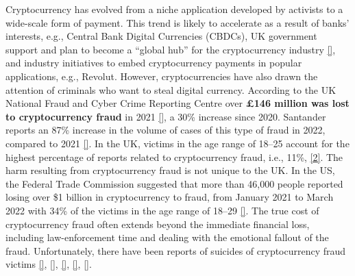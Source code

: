  Cryptocurrency has evolved from a niche application developed by activists to a wide-scale form of payment. This trend is likely to accelerate as a result of banks' interests, e.g., Central Bank Digital Currencies (CBDCs), UK government support and plan to become a ``global hub'' for the cryptocurrency industry \href{https://www.ft.com/content/24c9b6de-9cc6-4413-8b6a-e60653a29ce0?shareType=nongift}{[\printcntr]}, and industry initiatives to embed cryptocurrency payments in popular applications, e.g., Revolut. However, cryptocurrencies have also drawn the attention of criminals who want to steal digital currency. According to the UK National Fraud and Cyber Crime Reporting Centre over \textbf{£146 million was lost to cryptocurrency fraud} in 2021 \href{https://www.actionfraud.police.uk/news/cryptocurrency-fraud-leads-to-millions-in-losses-so-far-this-year} {[\printcntr]}, a 30\% increase since 2020. Santander reports an 87\% increase in the volume of cases of this type of fraud in 2022, compared to 2021 \href{https://www.santander.co.uk/about-santander/media-centre/press-releases/santander-warns-about-celebrity-endorsed-crypto-scams}{[\printcntr]}. In the UK, victims in the age range of 18–25 account for the highest percentage of reports related to cryptocurrency fraud, i.e., 11\%, \href{https://www.actionfraud.police.uk/news/cryptocurrency-fraud-leads-to-millions-in-losses-so-far-this-year} {[2]}. The harm resulting from cryptocurrency fraud is not unique to the UK. In the US, the Federal Trade Commission suggested that more than 46,000 people reported losing over \$1 billion in cryptocurrency to fraud, from January 2021 to March 2022 with 34\% of the victims in the age range of 18–29 \href{https://www.ftc.gov/news-events/data-visualizations/data-spotlight/2022/06/reports-show-scammers-cashing-crypto-craze}{[\printcntr]}. The true cost of cryptocurrency fraud often extends beyond the immediate financial loss, including law-enforcement time and dealing with the emotional fallout of the fraud. Unfortunately, there have been reports of suicides of cryptocurrency fraud victims 
 \href{https://www.vice.com/en/article/pkgda8/qanon-crypto-scam-whiplash347}{[\printcntr]},  \href{https://www.ozy.com/around-the-world/the-billion-dollar-crypto-currency-scams-youve-never-heard-about/266860/}{[\printcntr]},  \href{https://www.arabnews.com/node/1847671/middle-east}{[\printcntr]},  \href{https://english.sakshi.com/news/crime/suryapet-mans-suicide-over-cryptocurrency-fraud-could-be-tip-iceberg-147223}{[\printcntr]},  \href{https://www.reddit.com/r/CryptoCurrency/comments/r4asjl/someone_has_committed_suicide_after_losing_their/}{[\printcntr]}. 
 




